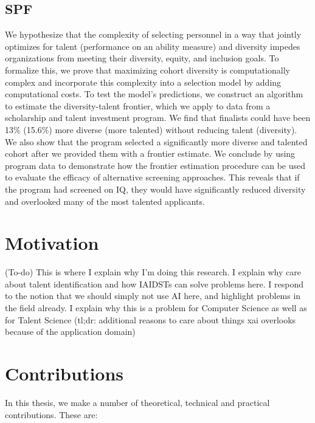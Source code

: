 \subsection{SPF}
We hypothesize that the complexity of selecting personnel in a way that jointly optimizes for talent (performance on an ability measure) and diversity impedes organizations from meeting their diversity, equity, and inclusion goals. To formalize this, we prove that maximizing cohort diversity is computationally complex and incorporate this complexity into a selection model by adding computational costs. To test the model's predictions, we construct an algorithm to estimate the diversity-talent frontier, which we apply to data from a scholarship and talent investment program. We find that finalists could have been 13\% (15.6\%) more diverse (more talented) without reducing talent (diversity). We also show that the program selected a significantly more diverse and talented cohort after we provided them with a frontier estimate. We conclude by using program data to demonstrate how the frontier estimation procedure can be used to evaluate the efficacy of alternative screening approaches. This reveals that if the program had screened on IQ, they would have significantly reduced diversity and overlooked many of the most talented applicants.

\section{Motivation}
(To-do) This is where I explain why I'm doing this research. I explain why care about talent identification and how IAIDSTs can solve problems here. I respond to the notion that we should simply not use AI here, and highlight problems in the field already. I explain why this is a problem for Computer Science as well as for Talent Science (tl;dr: additional reasons to care about things xai overlooks because of the application domain)

\section{Contributions}
In this thesis, we make a number of theoretical, technical and practical contributions. These are:


